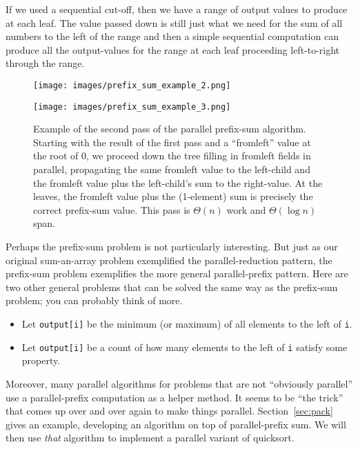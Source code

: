 \documentclass[10pt]{article}
\begin{document}
If we used a sequential cut-off, then we have a range of output values
to produce at each leaf.  The value passed down is still just what we
need for the sum of all numbers to the left of the range and then a
simple sequential computation can produce all the output-values for
the range at each leaf proceeding left-to-right through the range.

\begin{figure}
\begin{center}
\texttt{[image: images/prefix\_sum\_example\_2.png]}

\vspace{3ex}

\texttt{[image: images/prefix\_sum\_example\_3.png]}
\end{center}
\caption{Example of the second pass of the parallel prefix-sum
  algorithm.  Starting with the result of the first pass and a
  ``fromleft'' value at the root of 0, we proceed down the tree
  filling in fromleft fields in parallel, propagating the same
  fromleft value to the left-child and the fromleft value plus the
  left-child's sum to the right-value.  At the leaves, the fromleft
  value plus the (1-element) sum is precisely the correct prefix-sum
  value. This pass is $\Theta(n)$ work and $\Theta(\log n)$ span.}
\label{fig:prefix-pass-two}
\end{figure}

Perhaps the prefix-sum problem is not particularly interesting.  But
just as our original sum-an-array problem exemplified the
parallel-reduction pattern, the prefix-sum problem exemplifies the
more general parallel-prefix pattern.  Here are two other general
problems that can be solved the same way as the prefix-sum problem;
you can probably think of more.  
\begin{itemize}
\item Let {\tt output[i]} be the minimum (or maximum) of all elements
  to the left of {\tt i}.
\item Let {\tt output[i]} be a count of how many elements to the left
  of {\tt i} satisfy some property.
\end{itemize}

Moreover, many parallel algorithms for problems that are not
``obviously parallel'' use a parallel-prefix computation as a helper
method.  It seems to be ``the trick'' that comes up over and over
again to make things parallel.  Section~\ref{sec:pack} gives an
example, developing an algorithm on top of parallel-prefix sum.  We
will then use \emph{that} algorithm to implement a parallel variant of
quicksort.
\end{document}
